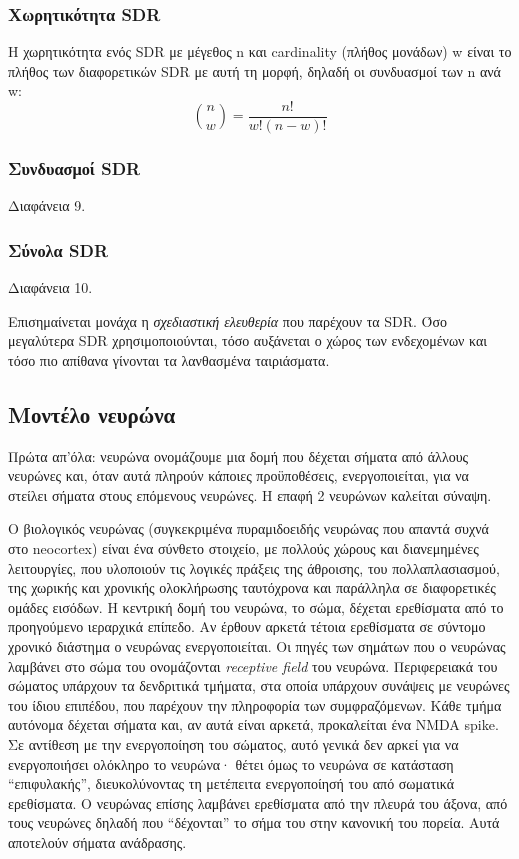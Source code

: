 \subsubsection{Χωρητικότητα SDR}

Η χωρητικότητα ενός SDR με μέγεθος n και cardinality (πλήθος μονάδων) w είναι το πλήθος των διαφορετικών SDR με αυτή τη μορφή, δηλαδή οι συνδυασμοί των n ανά w: $$ \binom nw= \frac{n!}{w!(n-w)!} $$

\subsubsection{Συνδυασμοί SDR}
Διαφάνεια 9.

\subsubsection{Σύνολα SDR}

Διαφάνεια 10.

Επισημαίνεται μονάχα η \emph{σχεδιαστική ελευθερία} που παρέχουν τα SDR.
Όσο μεγαλύτερα SDR χρησιμοποιούνται, τόσο αυξάνεται ο χώρος των ενδεχομένων και τόσο πιο απίθανα γίνονται τα λανθασμένα ταιριάσματα.


\subsection{Μοντέλο νευρώνα}

Πρώτα απ'όλα: νευρώνα ονομάζουμε μια δομή που δέχεται σήματα από άλλους νευρώνες και, όταν αυτά πληρούν κάποιες προϋποθέσεις, ενεργοποιείται, για να στείλει σήματα στους επόμενους νευρώνες.
Η επαφή 2 νευρώνων καλείται σύναψη.

Ο βιολογικός νευρώνας (συγκεκριμένα πυραμιδοειδής νευρώνας που απαντά συχνά στο neocortex) είναι ένα σύνθετο στοιχείο, με πολλούς χώρους και διανεμημένες λειτουργίες, που υλοποιούν τις λογικές πράξεις της άθροισης, του πολλαπλασιασμού, της χωρικής και χρονικής ολοκλήρωσης ταυτόχρονα και παράλληλα σε διαφορετικές ομάδες εισόδων.
Η κεντρική δομή του νευρώνα, το σώμα, δέχεται ερεθίσματα από το προηγούμενο ιεραρχικά επίπεδο.
Αν έρθουν αρκετά τέτοια ερεθίσματα σε σύντομο χρονικό διάστημα ο νευρώνας ενεργοποιείται.
Οι πηγές των σημάτων που ο νευρώνας λαμβάνει στο σώμα του ονομάζονται \emph{receptive field} του νευρώνα.
Περιφερειακά του σώματος υπάρχουν τα δενδριτικά τμήματα, στα οποία υπάρχουν συνάψεις με νευρώνες του ίδιου επιπέδου, που παρέχουν την πληροφορία των συμφραζόμενων.
Κάθε τμήμα αυτόνομα δέχεται σήματα και, αν αυτά είναι αρκετά, προκαλείται ένα NMDA spike.
Σε αντίθεση με την ενεργοποίηση του σώματος, αυτό γενικά δεν αρκεί για να ενεργοποιήσει ολόκληρο το νευρώνα· θέτει όμως το νευρώνα σε κατάσταση ``επιφυλακής'', διευκολύνοντας τη μετέπειτα ενεργοποίησή του από σωματικά ερεθίσματα.
Ο νευρώνας επίσης λαμβάνει ερεθίσματα από την πλευρά του άξονα, από τους νευρώνες δηλαδή που ``δέχονται'' το σήμα του στην κανονική του πορεία.
Αυτά αποτελούν σήματα ανάδρασης.

